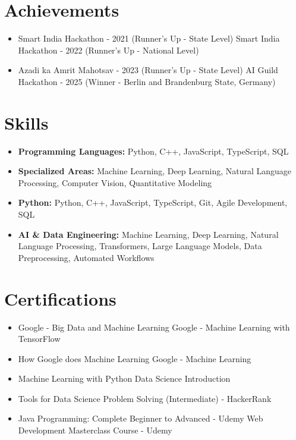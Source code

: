 \documentclass[a4paper,10pt]{article}
\begin{document}
\section*{Achievements}
\begin{itemize}
\item Smart India Hackathon - 2021 (Runner's Up - State Level) \hfill Smart India Hackathon - 2022 (Runner's Up - National Level)
\item Azadi ka Amrit Mahotsav - 2023 (Runner's Up - State Level) \hfill AI Guild Hackathon - 2025 (Winner - Berlin and Brandenburg State, Germany)
\end{itemize}

\section*{Skills}
\begin{itemize}
  \item \textbf{Programming Languages:} Python, C++, JavaScript, TypeScript, SQL
  \item \textbf{Specialized Areas:} Machine Learning, Deep Learning, Natural Language Processing, Computer Vision, Quantitative Modeling
  \item \textbf{Python:} Python, C++, JavaScript, TypeScript, Git, Agile Development, SQL
  \item \textbf{AI \& Data Engineering:} Machine Learning, Deep Learning, Natural Language Processing, Transformers, Large Language Models, Data Preprocessing, Automated Workflows
\end{itemize}

\section*{Certifications}
\begin{itemize}
\item Google - Big Data and Machine Learning \hfill Google - Machine Learning with TensorFlow
\item How Google does Machine Learning \hfill Google - Machine Learning
\item Machine Learning with Python \hfill Data Science Introduction
\item Tools for Data Science \hfill Problem Solving (Intermediate) - HackerRank
\item Java Programming: Complete Beginner to Advanced - Udemy \hfill Web Development Masterclass Course - Udemy
\end{itemize}
\end{document}
